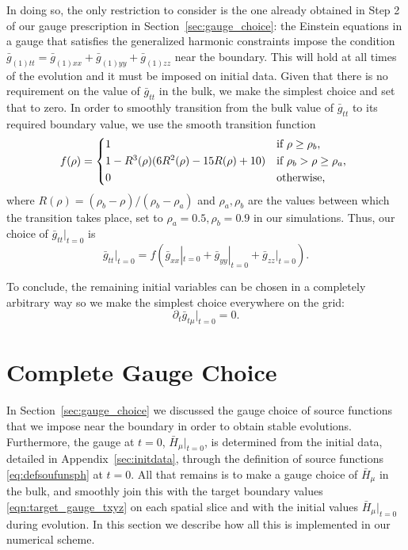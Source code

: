 \documentclass[a4paper,11pt]{article}
\numberwithin{equation}{section}
\begin{document}
In doing so, the only restriction to consider is the one already obtained in Step 2 of our gauge prescription in Section~\ref{sec:gauge_choice}: the Einstein equations in a gauge that satisfies the generalized harmonic constraints impose the condition $\bar{g}_{(1)tt}=\bar{g}_{(1)xx}+\bar{g}_{(1)yy}+\bar{g}_{(1)zz}$ near the boundary. This will hold at all times of the evolution and it must be imposed on initial data. Given that there is no requirement on the value of $\bar{g}_{tt}$ in the bulk, we make the simplest choice and set that to zero. In order to smoothly transition from the bulk value of $\bar{g}_{tt}$ to its required boundary value, we use the smooth transition function
  \begin{equation}
  \label{eq:transfunc}
    f(\rho) =
    \begin{cases*}
      1 & if $\rho\geq \rho_{b}$, \\
      1-R^3(\rho)(6 R^2(\rho)-15 R(\rho)+10) & if $\rho_{b} > \rho\geq\rho_{a}$, \\
      0        & otherwise,
    \end{cases*}
  \end{equation}
where $R(\rho)=(\rho_{b}-\rho)/(\rho_{b}-\rho_{a})$ and $\rho_{a},\rho_{b}$ are the values between which the transition takes place, set to $\rho_{a}=0.5,\rho_{b}=0.9$ in our simulations.
Thus, our choice of $\bar{g}_{tt}|_{t=0}$ is
\begin{equation}
\bar{g}_{tt}\big|_{t=0}=f(\bar{g}_{xx}|_{t=0}+\bar{g}_{yy}|_{t=0}+\bar{g}_{zz}|_{t=0}).
\end{equation}

To conclude, the remaining initial variables can be chosen in a completely arbitrary way so we make the simplest choice everywhere on the grid:
\begin{equation}
\partial_t\bar{g}_{t \mu}|_{t=0}=0.
\end{equation}

\section{Complete Gauge Choice}
\label{sec:GCbulk}

In Section~\ref{sec:gauge_choice} we discussed the gauge choice of source functions that we impose near the boundary in order to obtain stable evolutions. Furthermore, the gauge at $t=0$, $\bar{H}_{\mu}|_{t=0}$, is determined from the initial data, detailed in Appendix~\ref{sec:initdata}, through the definition of source functions \eqref{eq:defsoufunsph} at $t=0$. All that remains is to make a gauge choice of $\bar{H}_\mu$ in the bulk, and smoothly join this with the target boundary values \eqref{eqn:target_gauge_txyz} on each spatial slice and with the initial values $\bar{H}_{\mu}|_{t=0}$ during evolution. In this section we describe how all this is implemented in our numerical scheme.
\end{document}
